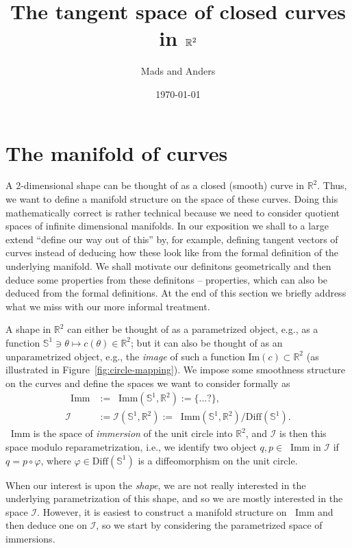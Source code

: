 \documentclass[a4,danish]{article}
\title{The tangent space of closed curves in $\R^2$}
\author{Mads and Anders}
\date{\today}
\theoremstyle{break}
\theoremstyle{definition}
\theoremstyle{Break}
\newcommand{\R}{\mathbb{R}}
\newcommand*\I{\mathop{}\!\mathrm{Imm}}
\renewcommand{\S}{\mathbb{S}}
\renewcommand{\phi}{\varphi}
\begin{document}


\section{The manifold of curves}
\label{sec:manifold-curves}

A 2-dimensional shape can be thought of as a closed (smooth) curve in $\R^2$. Thus, we want to define a manifold structure on the space of these curves. Doing this mathematically correct is rather technical because we need to consider quotient spaces of infinite dimensional manifolds. In our exposition we shall to a large extend ``define our way out of this'' by, for example, defining tangent vectors of curves instead of deducing how these look like from the formal definition of the underlying manifold. We shall motivate our definitons geometrically and then deduce some properties from these definitons -- properties, which can also be deduced from the formal definitions. At the end of this section we briefly address what we miss with our more informal treatment.

A shape in $\R^2$ can either be thought of as a parametrized object, e.g., as a function $\S^1 \ni \theta \mapsto c(\theta) \in \R^2$; but it can also be thought of as an unparametrized object, e.g., the \textit{image} of such a function $\text{Im}(c) \subset \R^2$ (as illustrated in Figure~\ref{fig:circle-mapping}). We impose some smoothness structure on the curves and define the spaces we want to consider formally as
\begin{equation*}
  \begin{aligned}
    \I & := \I(\S^1, \R^2)  :=  \{ ...? \}, \\
    \mathcal{I} & := \mathcal{I}(\S^1, \R^2)  := \I(\S^1, \R^2)/\mathrm{Diff}(\S^1).
  \end{aligned}
\end{equation*}
$\I$ is the space of \textit{immersion} of the unit circle into $\R^2$, and $\mathcal{I}$ is then this space modulo reparametrization, i.e., we identify two object $q,p \in \I$ in $\mathcal{I}$ if $q=p \circ \phi$, where $\phi \in \mathrm{Diff}(\S^1)$ is a diffeomorphism on the unit circle.

When our interest is upon the \textit{shape}, we are not really interested in the underlying parametrization of this shape, and so we are mostly interested in the space $\mathcal{I}$. However, it is easiest to construct a manifold structure on $\I$ and then deduce one on $\mathcal{I}$, so we start by considering the parametrized space of immersions. 
\end{document}
